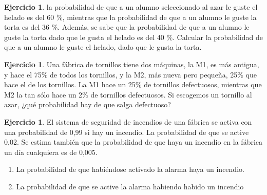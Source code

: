 \documentclass[]{book}
\providecommand{\tightlist}{%
  \setlength{\itemsep}{0pt}\setlength{\parskip}{0pt}}
\theoremstyle{plain}
\theoremstyle{definition}
\newtheorem{exercise}[theorem]{Ejercicio}
\theoremstyle{definition} %
\begin{document}
\begin{exercise}

  la probabilidad de que a un alumno seleccionado al azar le guste el
  helado es del 60 \%, mientras que la probabilidad de que a un alumno
  le guste la torta es del 36 \%. Además, se sabe que la probabilidad de
  que a un alumno le guste la torta dado que le gusta el helado es del
  40 \%. Calcular la probabilidad de que a un alumno le guste el helado,
  dado que le gusta la torta.
\end{exercise}
  \begin{exercise}

  Una fábrica de tornillos tiene dos máquinas, la M1, es más antigua, y
  hace el 75\% de todos los tornillos, y la M2, más nueva pero pequeña,
  25\% que hace el de los tornillos. La M1 hace un 25\% de tornillos
  defectuosos, mientras que M2 la tan sólo hace un 2\% de tornillos
  defectuosos. Si escogemos un tornillo al azar, ¿qué probabilidad hay
  de que salga defectuoso?
\end{exercise}

  \begin{exercise}

  El sistema de seguridad de incendios de una fábrica se activa con una
  probabilidad de 0,99 si hay un incendio. La probabilidad de que se
  active 0,02. Se estima también que la
  probabilidad de que haya un incendio en la fábrica un día cualquiera
  es de 0,005.

  \begin{enumerate}
  \def\labelenumii{\arabic{enumii}.}
  \tightlist
  \item
    La probabilidad de que habiéndose activado la alarma haya un
    incendio.
  \item
    La probabilidad de que se active la alarma habiendo habido un
    incendio
  \end{enumerate}
\end{exercise}

  
\end{document}
